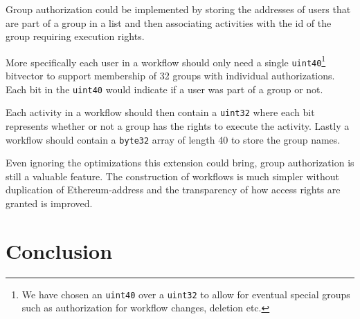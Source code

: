 \documentclass{article}
\begin{document}
		Group authorization could be implemented by storing the addresses of users that are part of a group in a list and then associating activities with the id of the group requiring execution rights.

		More specifically each user in a workflow should only need a single \texttt{uint40}\footnote{We have chosen an \texttt{uint40} over a \texttt{uint32} to allow for eventual special groups such as authorization for workflow changes, deletion etc.} bitvector to support membership of 32 groups with individual authorizations. Each bit in the \texttt{uint40} would indicate if a user was part of a group or not.

		Each activity in a workflow should then contain a \texttt{uint32} where each bit represents whether or not a group has the rights to execute the activity.
		Lastly a workflow should contain a \texttt{byte32} array of length 40 to store the group names.

		Even ignoring the optimizations this extension could bring, group authorization is still a valuable feature.
		The construction of workflows is much simpler without duplication of Ethereum-address and the transparency of how access rights are granted is improved.
		
	\section{Conclusion}
\end{document}
